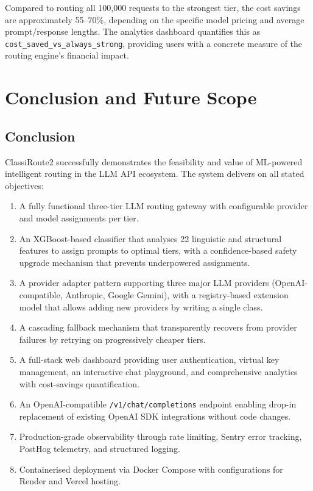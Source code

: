 \documentclass[12pt,a4paper]{report}
\begin{document}
Compared to routing all 100,000 requests to the strongest tier, the cost savings are approximately 55--70\%, depending on the specific model pricing and average prompt/response lengths. The analytics dashboard quantifies this as \texttt{cost\_saved\_vs\_always\_strong}, providing users with a concrete measure of the routing engine's financial impact.

\chapter{Conclusion and Future Scope}

\section{Conclusion}

ClassiRoute2 successfully demonstrates the feasibility and value of ML-powered intelligent routing in the LLM API ecosystem. The system delivers on all stated objectives:

\begin{enumerate}[nosep]
    \item A fully functional three-tier LLM routing gateway with configurable provider and model assignments per tier.
    \item An XGBoost-based classifier that analyses 22 linguistic and structural features to assign prompts to optimal tiers, with a confidence-based safety upgrade mechanism that prevents underpowered assignments.
    \item A provider adapter pattern supporting three major LLM providers (OpenAI-compatible, Anthropic, Google Gemini), with a registry-based extension model that allows adding new providers by writing a single class.
    \item A cascading fallback mechanism that transparently recovers from provider failures by retrying on progressively cheaper tiers.
    \item A full-stack web dashboard providing user authentication, virtual key management, an interactive chat playground, and comprehensive analytics with cost-savings quantification.
    \item An OpenAI-compatible \texttt{/v1/chat/completions} endpoint enabling drop-in replacement of existing OpenAI SDK integrations without code changes.
    \item Production-grade observability through rate limiting, Sentry error tracking, PostHog telemetry, and structured logging.
    \item Containerised deployment via Docker Compose with configurations for Render and Vercel hosting.
\end{enumerate}
\end{document}
